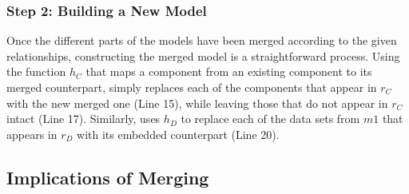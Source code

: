 
\subsubsection{Step 2: Building a New Model}

Once the different parts of the models have been merged according to
the given relationships, constructing the merged model is a
straightforward process. Using the function $h_{C}$ that maps a component
from an existing component to its merged counterpart, 
simply replaces each of the components that appear in $r_{C}$ with the
new merged one (Line 15), while leaving those that do not appear in
$r_{C}$ intact (Line 17). Similarly,  uses $h_{D}$
to replace each of the data sets from $m1$ that appears in $r_{D}$
with its embedded counterpart (Line 20).  

\subsection{Implications of Merging}

